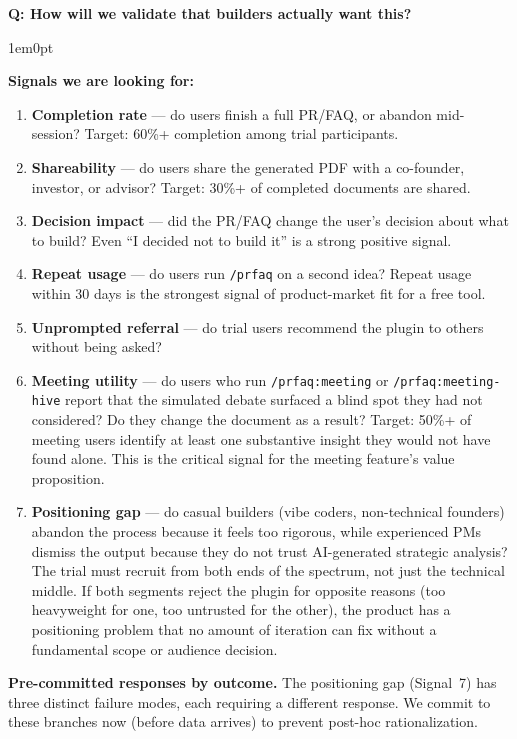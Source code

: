 \documentclass[11pt,letterpaper]{article}
\newcounter{faqnum}
\newenvironment{faqpair}[1]{%
  \needspace{4\baselineskip}%
  \vspace{0.5em}%
  \refstepcounter{faqnum}%
  \noindent\textbf{\color{SectionBlue}Q\thefaqnum: #1}\par\nopagebreak[4]%
  \vspace{0.2em}%
  \begin{adjustwidth}{1em}{0pt}%
  \setlength{\parindent}{0pt}%
}{%
  \end{adjustwidth}%
  \vspace{0.5em}%
}
\begin{document}
\begin{faqpair}{How will we validate that builders actually want this?}
  \textbf{Signals we are looking for:}
  \begin{enumerate}[nosep]
    \item \textbf{Completion rate} --- do users finish a full PR/FAQ, or abandon mid-session? Target: 60\%+ completion among trial participants.
    \item \textbf{Shareability} --- do users share the generated PDF with a co-founder, investor, or advisor? Target: 30\%+ of completed documents are shared.
    \item \textbf{Decision impact} --- did the PR/FAQ change the user's decision about what to build? Even ``I decided not to build it'' is a strong positive signal.
    \item \textbf{Repeat usage} --- do users run \texttt{/prfaq} on a second idea? Repeat usage within 30 days is the strongest signal of product-market fit for a free tool.
    \item \textbf{Unprompted referral} --- do trial users recommend the plugin to others without being asked?
    \item \textbf{Meeting utility} --- do users who run \texttt{/prfaq:meeting} or \texttt{/prfaq:meeting-hive} report that the simulated debate surfaced a blind spot they had not considered? Do they change the document as a result? Target: 50\%+ of meeting users identify at least one substantive insight they would not have found alone. This is the critical signal for the meeting feature's value proposition.
    \item \textbf{Positioning gap} --- do casual builders (vibe coders, non-technical founders) abandon the process because it feels too rigorous, while experienced PMs dismiss the output because they do not trust AI-generated strategic analysis? The trial must recruit from both ends of the spectrum, not just the technical middle. If both segments reject the plugin for opposite reasons (too heavyweight for one, too untrusted for the other), the product has a positioning problem that no amount of iteration can fix without a fundamental scope or audience decision.
  \end{enumerate}

  \textbf{Pre-committed responses by outcome.} The positioning gap (Signal~7) has three distinct failure modes, each requiring a different response. We commit to these branches now (before data arrives) to prevent post-hoc rationalization.


\end{faqpair}
\end{document}
